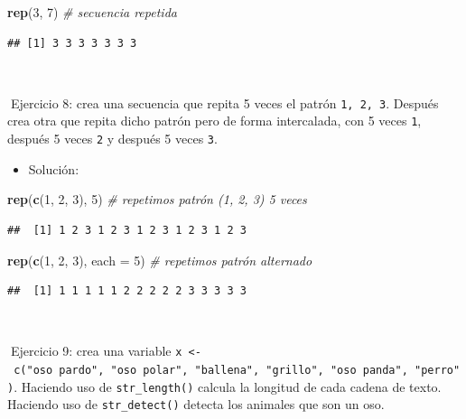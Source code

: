 \documentclass[11pt,]{book}
\newenvironment{Shaded}{\begin{snugshade}}{\end{snugshade}}
\newcommand{\CommentTok}[1]{\textcolor[rgb]{0.37,0.37,0.37}{\textit{#1}}}
\newcommand{\DataTypeTok}[1]{\textcolor[rgb]{0.27,0.27,0.27}{#1}}
\newcommand{\DecValTok}[1]{\textcolor[rgb]{0.06,0.06,0.06}{#1}}
\newcommand{\KeywordTok}[1]{\textcolor[rgb]{0.27,0.27,0.27}{\textbf{#1}}}
\newcommand{\NormalTok}[1]{#1}
\providecommand{\tightlist}{%
  \setlength{\itemsep}{0pt}\setlength{\parskip}{0pt}}
\begin{document}
\begin{Shaded}
\begin{Highlighting}[]
\KeywordTok{rep}\NormalTok{(}\DecValTok{3}\NormalTok{, }\DecValTok{7}\NormalTok{) }\CommentTok{# secuencia repetida}
\end{Highlighting}
\end{Shaded}

\begin{verbatim}
## [1] 3 3 3 3 3 3 3
\end{verbatim}

~

📝Ejercicio 8: crea una secuencia que repita 5 veces el patrón \texttt{1,\ 2,\ 3}. Después crea otra que repita dicho patrón pero de forma intercalada, con 5 veces \texttt{1}, después 5 veces \texttt{2} y después 5 veces \texttt{3}.

\begin{itemize}
\tightlist
\item
  Solución:
\end{itemize}

\begin{Shaded}
\begin{Highlighting}[]
\KeywordTok{rep}\NormalTok{(}\KeywordTok{c}\NormalTok{(}\DecValTok{1}\NormalTok{, }\DecValTok{2}\NormalTok{, }\DecValTok{3}\NormalTok{), }\DecValTok{5}\NormalTok{) }\CommentTok{# repetimos patrón (1, 2, 3) 5 veces}
\end{Highlighting}
\end{Shaded}

\begin{verbatim}
##  [1] 1 2 3 1 2 3 1 2 3 1 2 3 1 2 3
\end{verbatim}

\begin{Shaded}
\begin{Highlighting}[]
\KeywordTok{rep}\NormalTok{(}\KeywordTok{c}\NormalTok{(}\DecValTok{1}\NormalTok{, }\DecValTok{2}\NormalTok{, }\DecValTok{3}\NormalTok{), }\DataTypeTok{each =} \DecValTok{5}\NormalTok{) }\CommentTok{# repetimos patrón alternado}
\end{Highlighting}
\end{Shaded}

\begin{verbatim}
##  [1] 1 1 1 1 1 2 2 2 2 2 3 3 3 3 3
\end{verbatim}

~

📝Ejercicio 9: crea una variable \texttt{x\ \textless{}-\ c("oso\ pardo",\ "oso\ polar",\ "ballena",\ "grillo",\ "oso\ panda",\ "perro")}. Haciendo uso de \texttt{str\_length()} calcula la longitud de cada cadena de texto. Haciendo uso de \texttt{str\_detect()} detecta los animales que son un oso.
\end{document}
